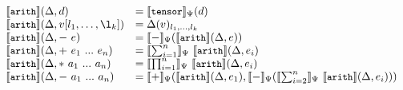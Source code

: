 \begin{equation*}
    \begin{array}{llll}
        \semArith{d}
        &= \semTensor_\networkTheoryVar(d)
        \\
        \semArith{v[l_1, \ldots, \l_k]} 
        &= \assertEnv(v)_{l_1, \ldots, l_k} 
        \\
        \semArith{{\mathtt{-}}~e}
        &= \sem{-}_\networkTheoryVar(\semArith{e}) 
        \\
        \semArith{\mathtt{+}~e_1~...~e_n} 
        &= \sem{\sum^n_{i=1}}_\networkTheoryVar~\semArith{e_i}
        \\
        \semArith{\mathtt{*}~a_1~...~a_n} 
        &= \sem{\prod^n_{i=1}}_\networkTheoryVar~\semArith{e_i}
        \\
        \semArith{\mathtt{-}~a_1~...~a_n} 
        &= \sem{+}_\networkTheoryVar(\semArith{e_1}, \sem{-}_\networkTheoryVar(\sem{\sum^n_{i=2}}_\networkTheoryVar~\semArith{e_i}))
    \end{array}
\end{equation*}